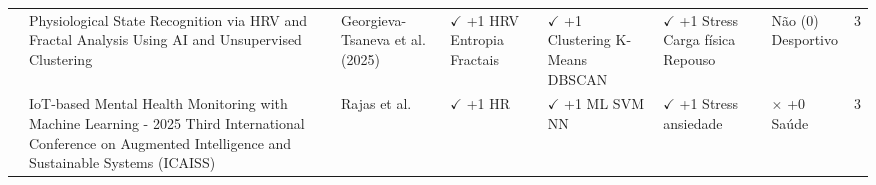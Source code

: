 \begin{table}[H]
{\begin{tabular}{>{\centering}p{0.5cm} p{4cm} >{\centering\arraybackslash}p{2cm} p{2cm} p{2cm} p{2cm} p{2cm} c}
\cite{georgieva2025} & Physiological State Recognition via HRV and Fractal Analysis Using AI and Unsupervised Clustering & Georgieva-Tsaneva et al. (2025) & \makecell[t]{$\checkmark$ +1 \\ HRV \\ Entropia \\ Fractais} & \makecell[t]{$\checkmark$ +1 \\ Clustering \\ K-Means \\ DBSCAN} & \makecell[t]{$\checkmark$ +1 \\ Stress \\ Carga física \\ Repouso} & \makecell[t]{Não (0) \\ Desportivo} & 3 \\
\cite{rajas2025} & IoT-based Mental Health Monitoring with Machine Learning - 2025 Third International Conference on Augmented Intelligence and Sustainable Systems (ICAISS) & Rajas et al. & \makecell[t]{$\checkmark$ +1 \\ HR} & \makecell[t]{$\checkmark$ +1 \\ ML\\SVM\\NN} & \makecell[t]{$\checkmark$ +1 \\ Stress \\ ansiedade} & \makecell[t]{$\times$ +0\\Saúde} & 3 \\
\hline
\end{tabular}
}%
\end{table}

